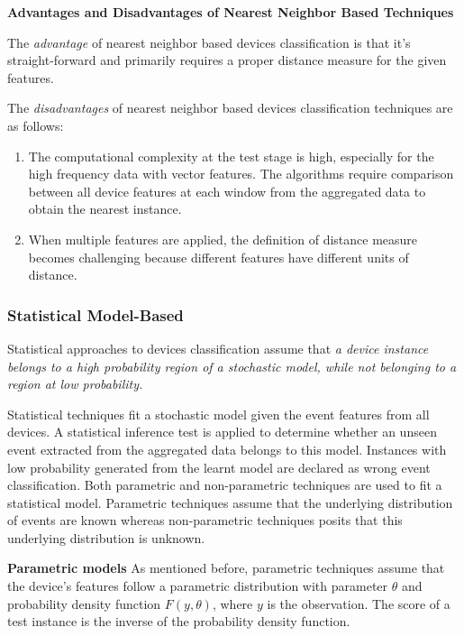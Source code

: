 \textbf{Advantages and Disadvantages of Nearest Neighbor Based Techniques}

The \textit{advantage} of nearest neighbor based devices classification is 
that it's straight-forward and primarily requires a proper distance measure for the given features. 

The \textit{disadvantages} of nearest neighbor based devices classification techniques are as follows:
\begin{enumerate}
\item The computational complexity at the test stage is high, 
especially for the high frequency data with vector features. 
The algorithms require comparison between all device features at each window from the aggregated data to obtain the nearest instance. 
\item When multiple features are applied, the definition of distance measure becomes challenging because different features have different units of distance.
\end{enumerate}

\subsubsection{Statistical Model-Based}
Statistical approaches to devices classification assume that \textit{a device instance belongs to a high probability region of 
a stochastic model, while not belonging to a region at low probability.}

Statistical techniques fit a stochastic model given the event features from all devices. 
A statistical inference test is applied to determine whether an 
unseen event extracted from the aggregated data belongs to this model. 
Instances with low probability generated from the learnt model 
are declared as wrong event classification. 
Both parametric and non-parametric techniques are used to fit a statistical model. 
Parametric techniques assume that the underlying distribution of 
events are known whereas non-parametric techniques posits that this 
underlying distribution is unknown. 


\textbf{Parametric models}
As mentioned before, parametric techniques assume that 
the device's features follow a parametric distribution 
with parameter $\theta$ and probability density function $F(y,\theta)$, 
where $y$ is the observation. 
The score of a test instance is the inverse of the probability density function. 


